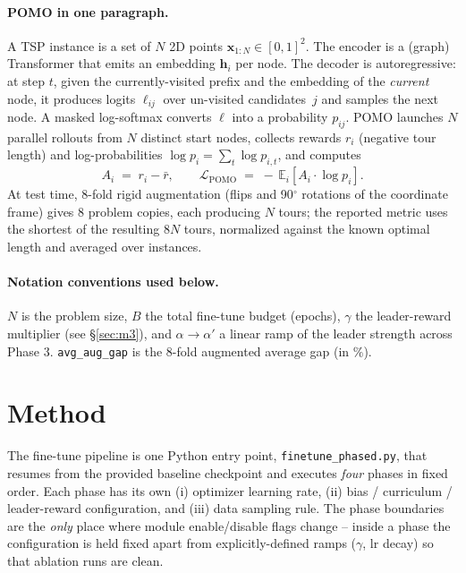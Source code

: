 \documentclass[11pt,a4paper]{article}
\begin{document}
\paragraph{POMO in one paragraph.} A TSP instance is a set of $N$ 2D points
$\mathbf{x}_{1{:}N}\in[0,1]^2$. The encoder is a (graph) Transformer that
emits an embedding $\mathbf{h}_i$ per node. The decoder is autoregressive:
at step $t$, given the currently-visited prefix and the embedding of the
\emph{current} node, it produces logits $\ell_{ij}$ over un-visited
candidates~$j$ and samples the next node. A masked log-softmax converts
$\ell$ into a probability $p_{ij}$. POMO launches $N$ parallel rollouts from
$N$ distinct start nodes, collects rewards $r_i$ (negative tour length) and
log-probabilities $\log p_i = \sum_t \log p_{i,t}$, and computes
\[
   A_i \;=\; r_i - \bar{r}, \qquad
   \mathcal{L}_{\text{POMO}} \;=\; -\,\mathbb{E}_i\!\left[A_i \cdot \log p_i\right].
\]
At test time, 8-fold rigid augmentation (flips and 90$^\circ$ rotations of
the coordinate frame) gives 8 problem copies, each producing $N$ tours; the
reported metric uses the shortest of the resulting $8N$ tours, normalized
against the known optimal length and averaged over instances.

\paragraph{Notation conventions used below.} $N$ is the problem size,
$B$ the total fine-tune budget (epochs), $\gamma$ the leader-reward multiplier
(see \S\ref{sec:m3}), and $\alpha\!\to\!\alpha'$ a linear ramp of the
leader strength across Phase 3. \texttt{avg\_aug\_gap} is the 8-fold augmented
average gap (in $\%$).

\section{Method}
\label{sec:method}

The fine-tune pipeline is one Python entry point,
\texttt{finetune\_phased.py}, that resumes from the provided baseline
checkpoint and executes \emph{four} phases in fixed order. Each phase has
its own (i) optimizer learning rate, (ii) bias / curriculum / leader-reward
configuration, and (iii) data sampling rule. The phase boundaries are the
\emph{only} place where module enable/disable flags change -- inside a phase
the configuration is held fixed apart from explicitly-defined ramps
($\gamma$, lr decay) so that ablation runs are clean.
\end{document}
